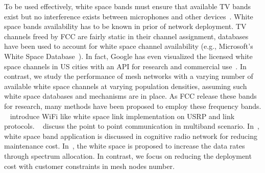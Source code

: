 To be used effectively, white space bands must ensure that available TV bands
exist but no interference exists between microphones and other devices~\cite{bahl2009white}. 
White space bands availability has to be known in prior of network deployment.
TV channels freed by FCC are fairly static in their channel assignment, 
databases have been used to account for white space channel availability 
(e.g., Microsoft's White Space Database~\cite{msdatabase}).
In fact, Google has even visualized the licensed white space channels 
in US cities with an API for research and commercial use~\cite{googledatabase}.
In contrast, we study the performance of mesh networks with a varying number 
of available white space channels at varying population densities, assuming 
such white space databases and mechanisms are in place. As FCC release these 
bands for research, many methods have been proposed to employ these frequency bands.
~\cite{bahl2009white} introduce WiFi like white space link implementation on USRP and 
link protocols. ~\cite{cui2013leveraging} discuss the point to point communication
in multiband scenario. In~\cite{filippini2013new}, white space band application is 
discussed in cognitive radio network for reducing maintenance cost. 
In~\cite{deb2009dynamic}, the white space is proposed to increase the 
data rates through spectrum allocation. 
In contrast, we focus on reducing the deployment cost with customer 
constraints in mesh nodes number.






